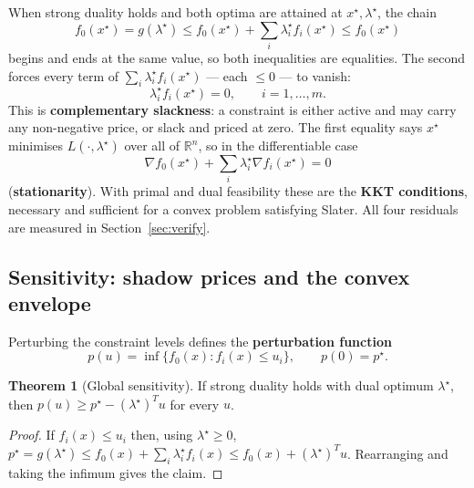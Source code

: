 \documentclass[11pt,a4paper]{article}
\theoremstyle{definition}
\newtheorem{theorem}{Theorem}
\newcommand{\R}{\mathbb{R}}
\newcommand{\pstar}{p^{\star}}
\newcommand{\xstar}{x^{\star}}
\newcommand{\lamstar}{\lambda^{\star}}
\begin{document}
When strong duality holds and both optima are attained at $\xstar,\lamstar$, the chain
\begin{equation}
f_{0}(\xstar)=g(\lamstar)\le f_{0}(\xstar)+\sum_{i}\lambda_{i}^{\star}f_{i}(\xstar)\le f_{0}(\xstar)
\end{equation}
begins and ends at the same value, so both inequalities are equalities. The second forces every
term of $\sum_{i}\lambda_{i}^{\star}f_{i}(\xstar)$ --- each $\le 0$ --- to vanish:
\begin{equation}\label{eq:cs}
\lambda_{i}^{\star}f_{i}(\xstar)=0,\qquad i=1,\dots,m.
\end{equation}
This is \textbf{complementary slackness}: a constraint is either active and may carry any
non-negative price, or slack and priced at zero. The first equality says $\xstar$ minimises
$L(\cdot,\lamstar)$ over all of $\R^{n}$, so in the differentiable case
\begin{equation}\label{eq:stat}
\nabla f_{0}(\xstar)+\sum_{i}\lambda_{i}^{\star}\nabla f_{i}(\xstar)=0
\end{equation}
(\textbf{stationarity}). With primal and dual feasibility these are the \textbf{KKT conditions},
necessary and sufficient for a convex problem satisfying Slater. All four residuals are measured
in Section~\ref{sec:verify}.

\subsection{Sensitivity: shadow prices and the convex envelope}\label{sec:pert}

Perturbing the constraint levels defines the \textbf{perturbation function}
\begin{equation}\label{eq:pu}
p(u)=\inf\{f_{0}(x):f_{i}(x)\le u_{i}\},\qquad p(0)=\pstar.
\end{equation}

\begin{theorem}[Global sensitivity]\label{thm:sens}
If strong duality holds with dual optimum $\lamstar$, then
$p(u)\ge\pstar-(\lamstar)^{T}u$ for every $u$.
\end{theorem}

\begin{proof}
If $f_{i}(x)\le u_{i}$ then, using $\lamstar\ge 0$,
$\pstar=g(\lamstar)\le f_{0}(x)+\sum_{i}\lambda_{i}^{\star}f_{i}(x)\le f_{0}(x)+(\lamstar)^{T}u$.
Rearranging and taking the infimum gives the claim.
\end{proof}
\end{document}
